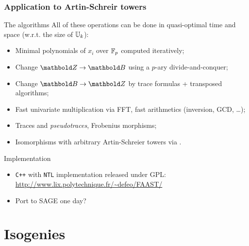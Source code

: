 \documentclass[10pt]{beamer}
\begin{document}
\begin{frame}
  \frametitle{Application to Artin-Schreir towers}

  \begin{block}{The algorithms}
    All of these operations can be done in quasi-optimal time and
    space (w.r.t. the size of $\mathbb{U}_k$):
    \begin{itemize}
    \item Minimal polynomials of $x_i$ over $\mathbb{F}_p$ computed
      iteratively;
    \item Change $\basis{Z}\ra\basis{B}$ using a $p$-ary
      divide-and-conquer;
    \item Change $\basis{B}\ra\basis{Z}$ by trace formulas +
      transposed algorithms;
    \item Fast univariate multiplication via FFT, fast arithmetics
      (inversion, GCD, \dots);
    \item Traces and \emph{pseudotraces}, Frobenius morphisms;
    \item \alert{Isomorphisms with arbitrary Artin-Schreier towers via
      \cite{couveignes00}.}
    \end{itemize}
  \end{block}

  \begin{block}{Implementation}
    \begin{itemize}
    \item \texttt{C++} with \texttt{NTL} implementation released under
      GPL: \url{http://www.lix.polytechnique.fr/~defeo/FAAST/}
    \item Port to SAGE one day?
    \end{itemize}
  \end{block}
\end{frame}


\section{Isogenies}
\end{document}

